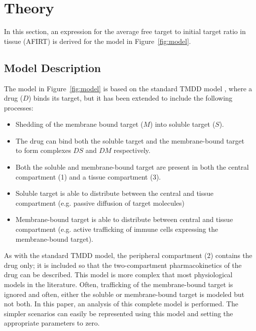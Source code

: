 \section{Theory}
In this section, an expression for the average free target to initial target ratio in tissue (AFIRT) is derived for the model in Figure~\ref{fig:model}.

\subsection{Model Description}
The model in Figure~\ref{fig:model} is based on the standard TMDD model \cite{mager01, stein17}, where a drug ($D$) binds its target, but it has been extended to include the following processes:
\begin{itemize}
\item Shedding of the membrane bound target ($M$) into soluble target ($S$).  
\item The drug can bind both the soluble target and the membrane-bound target to form complexes $DS$ and $DM$ respectively.
\item Both the soluble and membrane-bound target are present in both the central compartment (1) and a tissue compartment (3).
\item Soluble target is able to distribute between the central and tissue compartment (e.g. passive diffusion of target molecules)
\item Membrane-bound target is able to  distribute between central and tissue compartment (e.g. active trafficking of immune cells expressing the membrane-bound target).
\end{itemize}
As with the standard TMDD model, the peripheral compartment (2) contains the drug only; it is included so that the two-compartment pharmacokinetics of the drug can be described.  This model is more complex that most physiological models in the literature.  Often, trafficking of the membrane-bound target is ignored and often, either the soluble or membrane-bound target is modeled but not both.  In this paper, an analysis of this complete model is performed.  The simpler scenarios can easily be represented using this model and setting the appropriate parameters to zero.  

